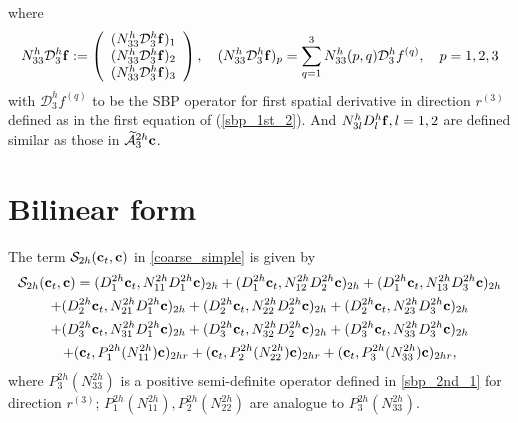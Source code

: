 where
\begin{align*}%
{N}_{33}^h\mathcal{D}_3^h{\bf f} := \left(\begin{array}{c}
({N}_{33}^h\mathcal{D}_3^h{\bf f})_1 \\
({N}_{33}^h\mathcal{D}_3^h{\bf f})_2 \\
({N}_{33}^h\mathcal{D}_3^h{\bf f})_3 
\end{array}\right), \quad ({N}_{33}^h\mathcal{D}_3^h{\bf f})_p = \sum_{q = 1}^{3} N_{33}^h(p,q)\mathcal{D}_3^h{f}^{(q)},\quad p = 1,2,3
\end{align*}
with $\mathcal{D}_3^h{f}^{(q)}$ to be the SBP operator for first spatial derivative in direction $r^{(3)}$ defined as in the first equation of (\ref{sbp_1st_2}). And $N_{3l}^hD_l^h{\bf f}, l=1,2$ are defined similar as those in $\widetilde{\mathcal{A}}_3^{2h}{\bf c}$.

\section{Bilinear form}\label{appendix_bf}
The term $\mathcal{S}_{2h}({\bf c}_t,{\bf c})$ in \eqref{coarse_simple} is given by
\begin{multline*}
\mathcal{S}_{2h}({\bf c}_t,{\bf c}) = ({D}_1^{2h}{\bf c}_t,{N}_{11}^{2h}{D}_1^{2h}{\bf c})_{2h} +  ({D}_1^{2h}{\bf c}_t,{N}_{12}^{2h}{D}_2^{2h}{\bf c})_{2h} +  ({D}_1^{2h}{\bf c}_t,{N}_{13}^{2h}{D}_3^{2h}{\bf c})_{2h}\\
+  ({D}_2^{2h}{\bf c}_t,{N}_{21}^{2h}{D}_1^{2h}{\bf c})_{2h} 
+  ({D}_2^{2h}{\bf c}_t,{N}_{22}^{2h}{D}_2^{2h}{\bf c})_{2h} +  ({D}_2^{2h}{\bf c}_t,{N}_{23}^{2h}{D}_3^{2h}{\bf c})_{2h} \\
+  ({D}_3^{2h}{\bf c}_t,{N}_{31}^{2h}{D}_1^{2h}{\bf c})_{2h} 
+  ({D}_3^{2h}{\bf c}_t,{N}_{32}^{2h}{D}_2^{2h}{\bf c})_{2h} +  ({D}_3^{2h}{\bf c}_t,{N}_{33}^{2h}{D}_3^{2h}{\bf c})_{2h}\\
+ ({\bf c}_t, P^{2h}_1(N_{11}^{2h}){\bf c})_{2hr} + ({\bf c}_t, P^{2h}_2(N_{22}^{2h}){\bf c})_{2hr} + ({\bf c}_t, P^{2h}_3(N_{33}^{2h}){\bf c})_{2hr},
\end{multline*}
where $P_3^{2h}(N_{33}^{2h})$ is a positive semi-definite operator defined in \eqref{sbp_2nd_1} for direction $r^{(3)}$; $P_1^{2h}(N_{11}^{2h}), P_2^{2h}(N_{22}^{2h})$ are analogue to $P_3^{2h}(N_{33}^{2h})$. 

